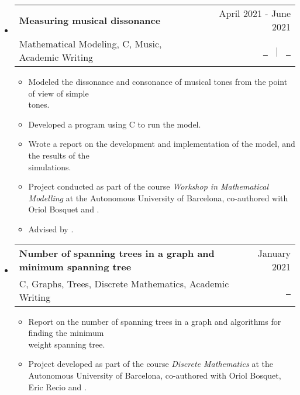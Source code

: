 \documentclass[a4paper,11pt]{article}
\makeatletter
\newcommand{\resumeItemListEnd}{\end{itemize}}
\newcommand{\resumeQuadHeading}[4]{
  \item
  \begin{tabular*}{0.96\textwidth}[t]{l@{\extracolsep{\fill}}r}
    \textbf{#1} & \small #2 \\
    \small#3 & \small #4 \\
  \end{tabular*}
}
\newcommand{\resumeHeadingListStart}{
  \begin{itemize}[leftmargin=0.15in, label={}]
}
\newcommand{\resumeHeadingListEnd}{\end{itemize}}
\makeatother
\begin{document}
\resumeHeadingListStart{}
\resumeQuadHeading{Measuring musical dissonance}{April 2021 - June 2021}{Mathematical Modeling, C, Music, Academic Writing}{\href{https://github.com/victorballester7/dissonance/blob/main/latex/main.pdf}{\faFileTextO \ \graydotuline{{Report \scriptsize (in Catalan)}}} \ $|$ \ \href{https://github.com/victorballester7/dissonance}{\faGithub \ \graydotuline{Code}}}
\begin{itemize}[leftmargin=3em, itemsep=0.1em, topsep=2pt]
  \item \small Modeled the dissonance and consonance of musical tones from the point of view of simple\\ tones.
  \item \small Developed a program using C to run the model.
  \item \small Wrote a report on the development and implementation of the model, and the results of the\\ simulations.
  \item \small Project conducted as part of the course \textit{Workshop in Mathematical Modelling} at the Autonomous University of Barcelona, co-authored with Oriol Bosquet and \href{https://github.com/carlosala}{}.
  \item \small Advised by \href{https://mat.uab.cat/departament/uab/pop_ex.php?id=208&lang=}{}.
\end{itemize}
\resumeHeadingListEnd{}

\resumeHeadingListStart{}
\resumeQuadHeading{Number of spanning trees in a graph and minimum spanning tree}{January 2021}{C, Graphs, Trees, Discrete Mathematics, Academic Writing}{\href{https://github.com/mathUAB/matematica-discreta/blob/main/Treball/Memoria-escrita/main.pdf}{\faFileTextO \ \graydotuline{{Report \scriptsize (in Catalan)}}}}
\begin{itemize}[leftmargin=3em, itemsep=0.1em, topsep=2pt]
  \item \small Report on the number of spanning trees in a graph and algorithms for finding the minimum\\ weight spanning tree.
  \item \small Project developed as part of the course \textit{Discrete Mathematics} at the Autonomous University of Barcelona, co-authored with Oriol Bosquet, Eric Recio and \href{https://github.com/carlosala}{}.
\end{itemize}
\resumeItemListEnd{}
\end{document}
